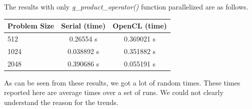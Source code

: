 \documentclass[]{scrartcl}
\begin{document}
The results with only \textit{g\_product\_operator()} function parallelized are as follows.
\begin{center}
	\begin{tabular}{|l | c | c|}
		\hline
		Problem Size & Serial (time) & OpenCL (time) \\ \hline
		512 & 0.26554 s  & 0.369021 s  \\ \hline
		1024 & 0.038892 s  & 0.351882 s  \\ \hline
		2048 & 0.390686 s  & 0.055191 s  \\
		\hline
	\end{tabular}
\end{center}

As can be seen from these results, we got a lot of random times. These times reported here are average times over a set
of runs. We could not clearly understand the reason for the trends.
\end{document}
